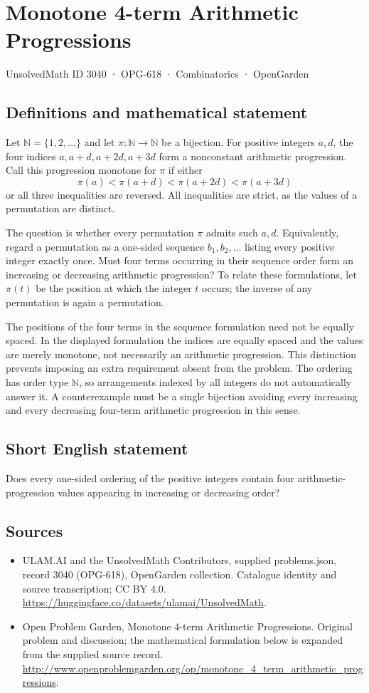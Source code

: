 \documentclass[11pt,a4paper]{article}
\begin{document}
\section*{Monotone 4-term Arithmetic Progressions}\label{3040}
{\small UnsolvedMath ID 3040 · OPG-618 · Combinatorics · OpenGarden}
\subsection{Definitions and mathematical statement}
Let $\mathbb N=\{1,2,\ldots\}$ and let $\pi:\mathbb N\to\mathbb N$ be a
bijection. For positive integers $a,d$, the four indices
$a,a+d,a+2d,a+3d$ form a nonconstant arithmetic progression. Call this
progression monotone for $\pi$ if either
\[
 \pi(a)<\pi(a+d)<\pi(a+2d)<\pi(a+3d)
\]
or all three inequalities are reversed. All inequalities are strict,
as the values of a permutation are distinct.

The question is whether every permutation $\pi$ admits such $a,d$.
Equivalently, regard a permutation as a one-sided sequence
$b_1,b_2,\ldots$ listing every positive integer exactly once. Must four
terms occurring in their sequence order form an increasing or decreasing
arithmetic progression? To relate these formulations, let $\pi(t)$ be the
position at which the integer $t$ occurs; the inverse of any permutation is
again a permutation.

The positions of the four terms in the sequence formulation need not be
equally spaced. In the displayed formulation the indices are equally
spaced and the values are merely monotone, not necessarily an arithmetic
progression. This distinction prevents imposing an extra requirement absent
from the problem. The ordering has order type $\mathbb N$, so arrangements
indexed by all integers do not automatically answer it. A counterexample
must be a single bijection avoiding every increasing and every decreasing
four-term arithmetic progression in this sense.
\subsection{Short English statement}
Does every one-sided ordering of the positive integers contain four arithmetic-progression values appearing in increasing or decreasing order?
\subsection{Sources}
\begin{itemize}
\item[S1] ULAM.AI and the UnsolvedMath Contributors, supplied problems.json, record 3040 (OPG-618), OpenGarden collection. Catalogue identity and source transcription; CC BY 4.0.
\url{https://huggingface.co/datasets/ulamai/UnsolvedMath}.
\item[S2] Open Problem Garden, Monotone 4-term Arithmetic Progressions. Original problem and discussion; the mathematical formulation below is expanded from the supplied source record.
\url{http://www.openproblemgarden.org/op/monotone_4_term_arithmetic_progressions}.
\end{itemize}
\end{document}
